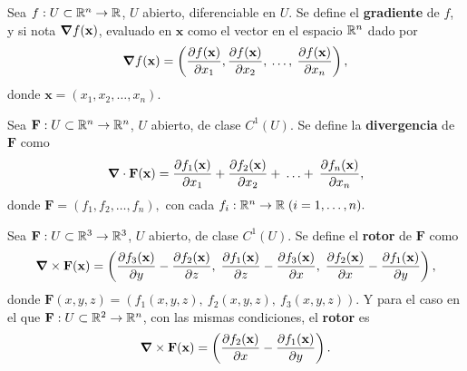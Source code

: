 \begin{definition}
    Sea $f:U\subset\mathbb{R}^n\to\mathbb{R}$, $U$ abierto, diferenciable en $U$. Se define el \textbf{gradiente} de $f$, y si nota $\grad f(\mathbf{x})$, evaluado en $\mathbf{x}$ como el vector en el espacio $\mathbb{R}^n$ dado por 
    \[
        \grad f(\mathbf{x})=\left(\frac{\partial f(\mathbf{x})}{\partial x_1},\frac{\partial f(\mathbf{x})}{\partial x_2},\:\ldots,\: \frac{\partial f(\mathbf{x})}{\partial x_n}\right),
    \]
    donde $\mathbf{x}=(x_1, x_2,\ldots, x_n)$.   
\end{definition}
\begin{definition}
    Sea $\mathbf{F}:U\subset\mathbb{R}^n\to\mathbb{R}^n$, $U$ abierto, de clase $C^1(U)$. Se define la \textbf{divergencia} de $\mathbf{F}$ como
    \[
        \grad\cdot \mathbf{F}(\mathbf{x})=\frac{\partial f_1(\mathbf{x})}{\partial x_1}+\frac{\partial f_2(\mathbf{x})}{\partial x_2}+\:\ldots+\: \frac{\partial f_n(\mathbf{x})}{\partial x_n},
    \]
    donde $\mathbf{F}=(f_1,f_2,\ldots,f_n),$ con cada $f_i:\mathbb{R}^n\to\mathbb{R}\;(i=1,\ldots,n).$
\end{definition}
\begin{definition}
    Sea $\mathbf{F}:U\subset\mathbb{R}^3\to\mathbb{R}^3$, $U$ abierto, de clase $C^1(U)$. Se define el \textbf{rotor} de $\mathbf{F}$ como 
    \[
        \grad\times\mathbf{F}(\mathbf{x})=\left(\frac{\partial f_3(\mathbf{x})}{\partial y}-\frac{\partial f_2(\mathbf{x})}{\partial z},\;\frac{\partial f_1(\mathbf{x})}{\partial z}-\frac{\partial f_3(\mathbf{x})}{\partial x},\;\frac{\partial f_2(\mathbf{x})}{\partial x}-\frac{\partial f_1(\mathbf{x})}{\partial y}\right),
    \]   
    donde $\mathbf{F}(x,y,z)=(f_1(x,y,z),\:f_2(x,y,z),\:f_3(x,y,z))$.
    Y para el caso en el que $\mathbf{F}:U\subset\mathbb{R}^2\to\mathbb{R}^n$, con las mismas condiciones, el \textbf{rotor} es
    \[
        \grad\times\mathbf{F}(\mathbf{x})=\left(\frac{\partial f_2(\mathbf{x})}{\partial x}-\frac{\partial f_1(\mathbf{x})}{\partial y}\right).
    \]
\end{definition}

